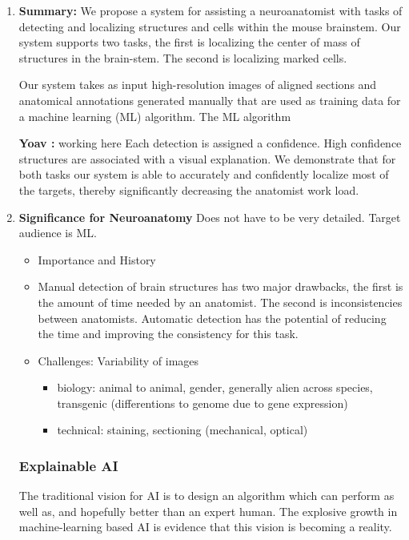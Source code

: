 \documentclass[runningheads]{llncs}
\newcommand{\comment}[3]{{\color{#1} {\bf #2 :} #3}}
\newcommand{\yoav}[1]{\comment{purple}{Yoav}{#1}}
\begin{document}
\begin{enumerate}
\item {\bf Summary:} We propose a system for assisting a neuroanatomist
  with tasks of detecting and localizing structures and cells within the mouse brainstem. Our system supports two tasks, the first is localizing the center of mass of structures in the brain-stem. The second is localizing marked cells.
  
  Our system takes as input high-resolution images of aligned
  sections and anatomical annotations generated manually that are used as training data for a machine learning (ML) algorithm. The ML algorithm 
  
  \yoav{working here}
  Each detection is assigned a confidence. High
  confidence structures are associated with a visual explanation.
  We demonstrate that for both tasks our system is able
  to accurately and confidently localize most of the targets, thereby
  significantly decreasing the anatomist work load.

\item {\bf Significance for Neuroanatomy}
Does not have to be very detailed. Target audience is ML.
\begin{itemize}
\item Importance and History
\item Manual detection of brain structures has two major drawbacks, the first is the amount of time needed by an anatomist. The second is inconsistencies between anatomists. Automatic detection has the potential of reducing the time and improving the consistency for this task.
\item Challenges: Variability of images
    \begin{itemize}
        \item biology: animal to animal, gender, generally alien across species, transgenic (differentions to genome due to gene expression)
        \item technical: staining, sectioning (mechanical, optical)
    \end{itemize}
  \end{itemize}
  
\subsubsection{Explainable AI} The traditional vision for AI is to design
an algorithm which can perform as well as, and hopefully better than
an expert human. The explosive growth in machine-learning based AI is
evidence that this vision is becoming a reality.


\end{enumerate}
\end{document}
